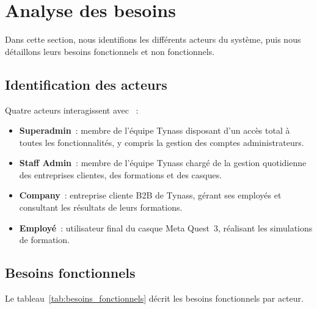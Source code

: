\section{Analyse des besoins}

Dans cette section, nous identifions les différents acteurs du système,
puis nous détaillons leurs besoins fonctionnels et non fonctionnels.

\subsection{Identification des acteurs}

Quatre acteurs interagissent avec \tynassit{}~:

\begin{itemize}
  \item \textbf{Superadmin}~: membre de l'équipe Tynass disposant d'un accès total à
    toutes les fonctionnalités, y compris la gestion des comptes administrateurs.
  \item \textbf{Staff Admin}~: membre de l'équipe Tynass chargé de la gestion quotidienne
    des entreprises clientes, des formations et des casques.
  \item \textbf{Company}~: entreprise cliente B2B de Tynass, gérant ses employés et
    consultant les résultats de leurs formations.
  \item \textbf{Employé}~: utilisateur final du casque Meta Quest~3, réalisant les
    simulations de formation.
\end{itemize}

\subsection{Besoins fonctionnels}

Le tableau~\ref{tab:besoins_fonctionnels} décrit les besoins fonctionnels par acteur.

